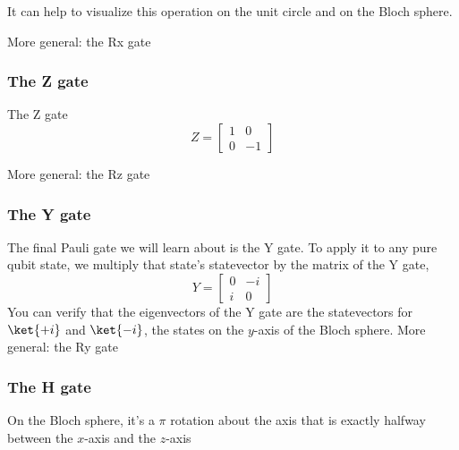 \documentclass{article}
\theoremstyle{definition}
\begin{document}
It can help to visualize this operation on the unit circle and on the Bloch sphere.

\begin{figure}[H]
\end{figure}
\begin{figure}[H]
\end{figure}
More general: the Rx gate

\subsubsection{The Z gate}
The Z gate
\begin{equation}
	Z = \begin{bmatrix}
		1 & 0\\
		0 & -1
	\end{bmatrix}
\end{equation}
\begin{figure}[H]
\end{figure}
\begin{figure}[H]
\end{figure}
More general: the Rz gate

\subsubsection{The Y gate}
The final Pauli gate we will learn about is the Y gate.
To apply it to any pure qubit state, we multiply that state's statevector by the matrix of the Y gate,
\begin{equation}
	Y = \begin{bmatrix}
		0 & -i\\
		i & 0
	\end{bmatrix}
\end{equation}
You can verify that the eigenvectors of the Y gate are the statevectors for $\ket{+i}$ and $\ket{-i}$, the states on the $y$-axis of the Bloch sphere.
More general: the Ry gate

\newpage
\subsubsection{The H gate}
\begin{figure}[H]
	\label{fig:Hgate}
\end{figure}
On the Bloch sphere, it's a $\pi$ rotation about the axis that is exactly halfway between the $x$-axis and the $z$-axis
\end{document}
